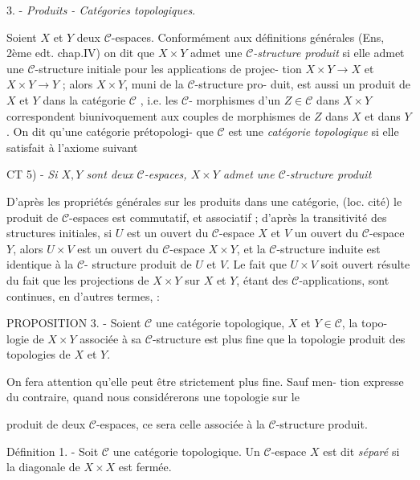 3. - \emph{Produits - Catégories topologiques}.

Soient $X$ et $Y$ deux $\mathcal{C}$-espaces. Conformément aux définitions générales
(Ens, 2ème edt. chap.IV) on dit que $X \times Y$ admet une \emph{$\mathcal{C}$-structure produit}
si elle admet une $\mathcal{C}$-structure initiale pour les applications de projec-
tion $X \times Y \longrightarrow X$ et $X \times Y \longrightarrow Y$ ; alors $X \times Y$, muni de la $\mathcal{C}$-structure pro-
duit, est aussi un produit de $X$ et $Y$ dans la catégorie $\mathcal{C}$ , i.e. les $\mathcal{C}$-
morphismes d'un $Z \in \mathcal{C}$ dans $X \times Y$ correspondent biunivoquement aux couples
de morphismes de $Z$ dans $X$ et dans $Y$. On dit qu'une catégorie prétopologi-
que $\mathcal{C}$ est une \emph{catégorie topologique} si elle satisfait à l'axiome suivant

CT 5) - \emph{Si $X,Y$ sont deux $\mathcal{C}$-espaces, $X \times Y$ admet une $\mathcal{C}$-structure produit}

D'après les propriétés générales sur les produits dans une catégorie,
(loc. cité) le produit de $\mathcal{C}$-espaces est commutatif, et associatif ;
d'après la transitivité des structures initiales, si $U$ est un ouvert du
$\mathcal{C}$-espace $X$ et $V$ un ouvert du $\mathcal{C}$-espace $Y$, alors $U \times V$ est un ouvert du
$\mathcal{C}$-espace $X \times Y$, et la $\mathcal{C}$-structure induite est identique à la $\mathcal{C}$-
structure produit de $U$ et $V$. Le fait que $U \times V$ soit ouvert résulte du fait
que les projections de $X \times Y$ sur $X$ et $Y$, étant des $\mathcal{C}$-applications, sont
continues, en d'autres termes, :

PROPOSITION 3. - Soient $\mathcal{C}$ une catégorie topologique, $X$ et $Y \in \mathcal{C}$, la topo-
logie de $X \times Y$ associée à sa $\mathcal{C}$-structure est plus fine que la topologie
produit des topologies de $X$ et $Y$.

On fera attention qu'elle peut être strictement plus fine. Sauf men-
tion expresse du contraire, quand nous considérerons une topologie sur le

\newpage


produit de deux $\mathcal{C}$-espaces, ce sera celle associée à la $\mathcal{C}$-structure
produit.

Définition 1. - Soit $\mathcal{C}$ une catégorie topologique. Un $\mathcal{C}$-espace $X$ est
dit \emph{séparé} si la diagonale de $X \times X$ est fermée.

